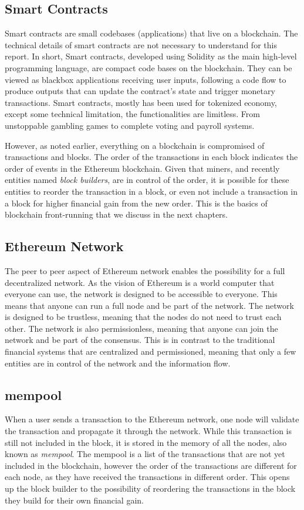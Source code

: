 \subsection{Smart Contracts}
Smart contracts are small codebases (applications) that live on a blockchain. The technical details of smart contracts are not necessary to understand for this report. In short, Smart contracts, developed using Solidity as the main high-level programming language, are compact code bases on the blockchain. They can be viewed as blackbox applications receiving user inputs, following a code flow to produce outputs that can update the contract's state and trigger monetary transactions. Smart contracts, mostly has been used for tokenized economy, except some technical limitation, the functionalities are limitless. From unstoppable gambling games to complete voting and payroll systems. 

However, as noted earlier, everything on a blockchain is compromised of transactions and blocks. The order of the transactions in each block indicates the order of events in the Ethereum blockchain. Given that miners, and recently entities named \textit{block builders}, are in control of the order, it is possible for these entities to reorder the transaction in a block, or even not include a transaction in a block for higher financial gain from the new order. This is the basics of blockchain front-running that we discuss in the next chapters. 


\subsection{Ethereum Network}
The peer to peer aspect of Ethereum network enables the possibility for a full decentralized network. As the vision of Ethereum is a world computer that everyone can use, the network is designed to be accessible to everyone. This means that anyone can run a full node and be part of the network. The network is designed to be trustless, meaning that the nodes do not need to trust each other. The network is also permissionless, meaning that anyone can join the network and be part of the consensus. This is in contrast to the traditional financial systems that are centralized and permissioned, meaning that only a few entities are in control of the network and the information flow.


\subsection{mempool}
When a user sends a transaction to the Ethereum network, one node will validate the transaction and propagate it through the network. While this transaction is still not included in the block, it is stored in the memory of all the nodes, also known as \textit{mempool}. The mempool is a list of the transactions that are not yet included in the blockchain, however the order of the transactions are different for each node, as they have received the transactions in different order. This opens up the block builder to the possibility of reordering the transactions in the block they build for their own financial gain.


